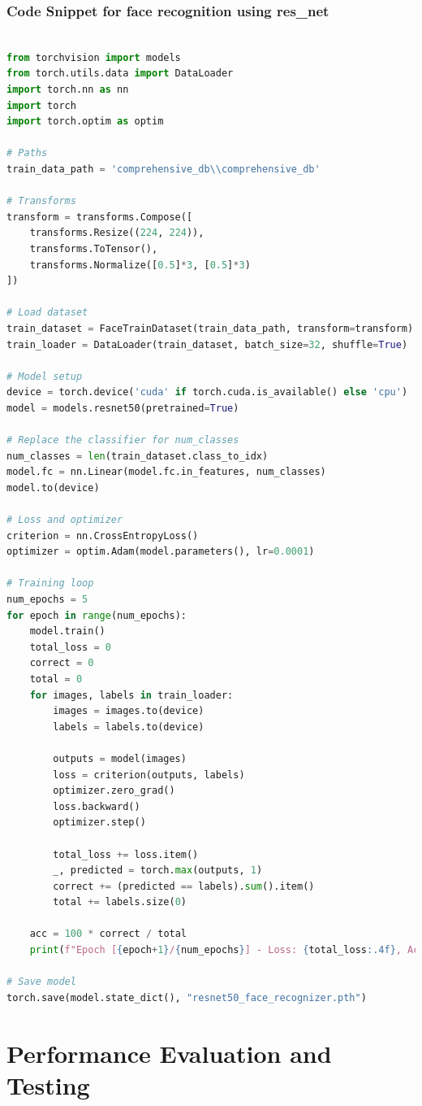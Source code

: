 \documentclass[openany]{report}
\begin{document}
\subsection{Code Snippet for face recognition using res\_net}
\begin{lstlisting}[language=Python]

from torchvision import models
from torch.utils.data import DataLoader
import torch.nn as nn
import torch
import torch.optim as optim

# Paths
train_data_path = 'comprehensive_db\\comprehensive_db'

# Transforms
transform = transforms.Compose([
    transforms.Resize((224, 224)),
    transforms.ToTensor(),
    transforms.Normalize([0.5]*3, [0.5]*3)
])

# Load dataset
train_dataset = FaceTrainDataset(train_data_path, transform=transform)
train_loader = DataLoader(train_dataset, batch_size=32, shuffle=True)

# Model setup
device = torch.device('cuda' if torch.cuda.is_available() else 'cpu')
model = models.resnet50(pretrained=True)

# Replace the classifier for num_classes
num_classes = len(train_dataset.class_to_idx)
model.fc = nn.Linear(model.fc.in_features, num_classes)
model.to(device)

# Loss and optimizer
criterion = nn.CrossEntropyLoss()
optimizer = optim.Adam(model.parameters(), lr=0.0001)

# Training loop
num_epochs = 5
for epoch in range(num_epochs):
    model.train()
    total_loss = 0
    correct = 0
    total = 0
    for images, labels in train_loader:
        images = images.to(device)
        labels = labels.to(device)

        outputs = model(images)
        loss = criterion(outputs, labels)
        optimizer.zero_grad()
        loss.backward()
        optimizer.step()

        total_loss += loss.item()
        _, predicted = torch.max(outputs, 1)
        correct += (predicted == labels).sum().item()
        total += labels.size(0)

    acc = 100 * correct / total
    print(f"Epoch [{epoch+1}/{num_epochs}] - Loss: {total_loss:.4f}, Accuracy: {acc:.2f}%")

# Save model
torch.save(model.state_dict(), "resnet50_face_recognizer.pth")
\end{lstlisting}

\chapter{Performance Evaluation and Testing}
\end{document}
